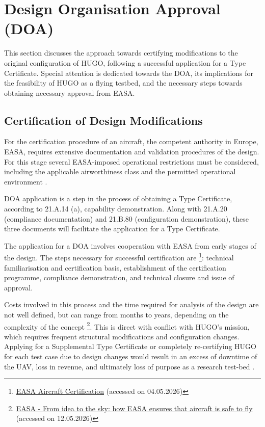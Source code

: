 \section{Design Organisation Approval (DOA)} \label{sec: DOA}
This section discusses the approach towards certifying modifications to the original configuration of HUGO, following a successful application for a Type Certificate. Special attention is dedicated towards the DOA, its implications for the feasibility of HUGO as a flying testbed, and the necessary steps towards obtaining necessary approval from EASA.

\subsection{Certification of Design Modifications}
For the certification procedure of an aircraft, the competent authority in Europe, EASA, requires extensive documentation and validation procedures of the design. For this stage several EASA-imposed operational restrictions must be considered, including the applicable airworthiness class and the permitted operational environment \cite{EASAInitialAirworthiness2025}.

DOA application is a step in the process of obtaining a Type Certificate, according to 21.A.14 (a), capability demonstration. Along with 21.A.20 (compliance documentation) and 21.B.80 (configuration demonstration), these three documents will facilitate the application for a Type Certificate.

The application for a DOA involves cooperation with EASA from early stages of the design. The steps necessary for successful certification are \footnote{\href{https://www.easa.europa.eu/en/domains/aircraft-products/aircraft-certification?}{EASA Aircraft Certification} (accessed on 04.05.2026)}: technical familiarisation and certification basis, establishment of the certification programme, compliance demonstration, and technical closure and issue of approval.

Costs involved in this process and the time required for analysis of the design are not well defined, but can range from months to years, depending on the complexity of the concept \footnote{\href{https://www.easa.europa.eu/en/light/topics/idea-sky-how-easa-ensures-aircraft-safe-fly}{EASA - From idea to the sky: how EASA ensures that aircraft is safe to fly} (accessed on 12.05.2026)}. This is direct with conflict with HUGO's mission, which requires frequent structural modifications and configuration changes. Applying for a Supplemental Type Certificate or completely re-certifying HUGO for each test case due to design changes would result in an excess of downtime of the UAV, loss in revenue, and ultimately loss of purpose as a research test-bed \cite{EU2019_2153_fees-and-charges}.


